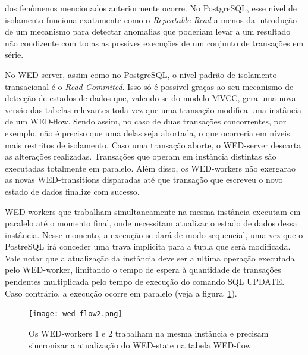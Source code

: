 \documentclass[conference]{IEEEtran}
\begin{document}
dos fenômenos mencionados anteriormente ocorre. No PostgreSQL, esse nível de isolamento funciona exatamente como o \emph{Repeatable Read}
a menos da introdução de um mecanismo para detectar anomalias que poderiam levar a um resultado não condizente com todas
as possives execuções de um conjunto de transações em série.
\par No WED-server, assim como no PostgreSQL, o nível padrão de isolamento transacional é o \emph{Read Commited}. Isso só
é possível graças ao seu mecanismo de detecção de estados de dados que, valendo-se do modelo MVCC, gera uma nova versão das
tabelas relevantes toda vez que uma transação modifica uma instância de um WED-flow. Sendo assim, no caso de duas transações 
concorrentes, por exemplo, não é preciso que uma delas seja abortada, o que ocorreria em níveis mais restritos de isolamento.
Caso uma transação aborte, o WED-server descarta as alterações realizadas. Transações que operam em instância distintas 
são executadas totalmente em paralelo. Além disso, os WED-workers não exergarao as novas WED-transitions 
disparadas até que transação que escreveu o novo estado de dados finalize com sucesso.
\par WED-workers que trabalham simultaneamente na mesma instância executam em paralelo até o momento final, onde necessitam
atualizar o estado de dados dessa instância. Nesse momento, a execução se dará de modo sequencial, uma vez que o PostreSQL
irá conceder uma trava implicita para a tupla que será modificada. Vale notar que a atualização da instância deve ser a 
ultima operação executada pelo WED-worker, limitando o tempo de espera à quantidade de transações pendentes multiplicada 
pelo tempo de execução do comando SQL UPDATE. Caso contrário, a execução ocorre em paralelo (veja a figura~\ref{fig_wf}).
   
\begin{figure}[!t]
\centering
\texttt{[image: wed-flow2.png]}
\caption{Os WED-workers 1 e 2 trabalham na mesma instância e precisam sincronizar a atualização do WED-state na tabela
WED-flow}
\label{fig_wf}
\end{figure}

\end{document}

